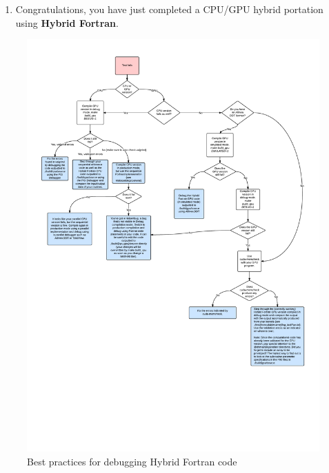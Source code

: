 \begin{enumerate}
 \item Congratulations, you have just completed a CPU/GPU hybrid portation using \textbf{Hybrid Fortran}.
\end{enumerate}

\begin{figure}[hbtp]
  \centering  \includegraphics[width=16cm]{figures/HybridFortranDebugging.pdf}
  \caption [Best practices debugging]{Best practices for debugging Hybrid Fortran code}
  \label{figure:bestPractDebugging}
\end{figure}

